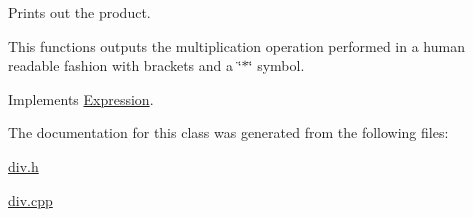 Prints out the product. 

This functions outputs the multiplication operation performed in a human readable fashion with brackets and a \char`\"{}$\ast$\char`\"{} symbol. 

Implements \hyperlink{class_expression_a6e05f883ebf77faf344dbaebfc82b3a0}{Expression}.



The documentation for this class was generated from the following files\+:\begin{DoxyCompactItemize}
\item 
\hyperlink{div_8h}{div.\+h}\item 
\hyperlink{div_8cpp}{div.\+cpp}\end{DoxyCompactItemize}

